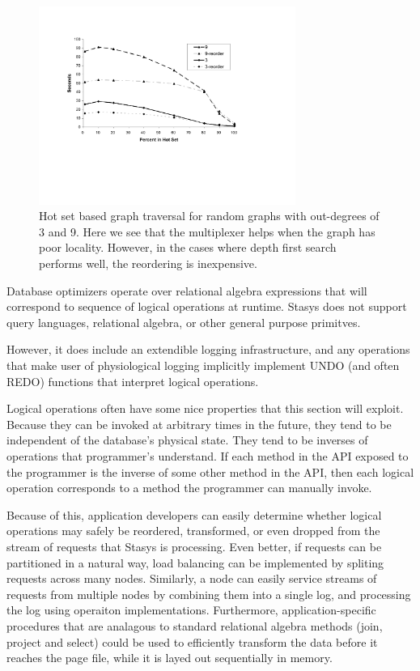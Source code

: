 \documentclass[letterpaper,twocolumn,10pt]{article}
\newcommand{\yad}{Stasys\xspace}
\begin{document}
\begin{figure}[t]
\includegraphics[width=3.3in]{figs/trans-closure-hotset.pdf}
\vspace{-12pt}
\caption{\sf\label{fig:hotGraph} Hot set based graph traversal for random graphs with out-degrees of 3 and 9.  Here
we see that the multiplexer helps when the graph has poor locality.
However, in the cases where depth first search performs well, the
reordering is inexpensive.}
\end{figure}

Database optimizers operate over relational algebra expressions that
will correspond to sequence of logical operations at runtime.  \yad
does not support query languages, relational algebra, or other general
purpose primitves.

However, it does include an extendible logging infrastructure, and any
operations that make user of physiological logging implicitly
implement UNDO (and often REDO) functions that interpret logical
operations.

Logical operations often have some nice properties that this section
will exploit.  Because they can be invoked at arbitrary times in the
future, they tend to be independent of the database's physical state.
They tend to be inverses of operations that programmer's understand.
If each method in the API exposed to the programmer is the inverse of
some other method in the API, then each logical operation corresponds
to a method the programmer can manually invoke.

Because of this, application developers can easily determine whether
logical operations may safely be reordered, transformed, or even
dropped from the stream of requests that \yad is processing.  Even
better, if requests can be partitioned in a natural way, load
balancing can be implemented by spliting requests across many nodes.
Similarly, a node can easily service streams of requests from multiple
nodes by combining them into a single log, and processing the log
using operaiton implementations.  Furthermore, application-specific
procedures that are analagous to standard relational algebra methods
(join, project and select) could be used to efficiently transform the data
before it reaches the page file, while it is layed out sequentially
in memory.
\end{document}
